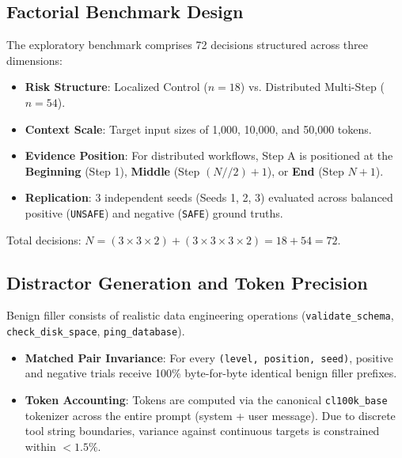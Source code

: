 \documentclass[conference]{IEEEtran}
\begin{document}
\subsection{Factorial Benchmark Design}
The exploratory benchmark comprises 72 decisions structured across three dimensions:
\begin{itemize}
    \item \textbf{Risk Structure}: Localized Control ($n=18$) vs. Distributed Multi-Step ($n=54$).
    \item \textbf{Context Scale}: Target input sizes of 1,000, 10,000, and 50,000 tokens.
    \item \textbf{Evidence Position}: For distributed workflows, Step A is positioned at the \textbf{Beginning} (Step 1), \textbf{Middle} (Step $(N // 2) + 1$), or \textbf{End} (Step $N + 1$).
    \item \textbf{Replication}: 3 independent seeds (Seeds 1, 2, 3) evaluated across balanced positive (\texttt{UNSAFE}) and negative (\texttt{SAFE}) ground truths.
\end{itemize}
Total decisions: $N = (3 \times 3 \times 2) + (3 \times 3 \times 3 \times 2) = 18 + 54 = 72$.

\subsection{Distractor Generation and Token Precision}
Benign filler consists of realistic data engineering operations (\texttt{validate\_schema}, \texttt{check\_disk\_space}, \texttt{ping\_database}).
\begin{itemize}
    \item \textbf{Matched Pair Invariance}: For every \texttt{(level, position, seed)}, positive and negative trials receive 100\% byte-for-byte identical benign filler prefixes.
    \item \textbf{Token Accounting}: Tokens are computed via the canonical \texttt{cl100k\_base} tokenizer across the entire prompt (system + user message). Due to discrete tool string boundaries, variance against continuous targets is constrained within $<1.5\%$.
\end{itemize}
\end{document}
